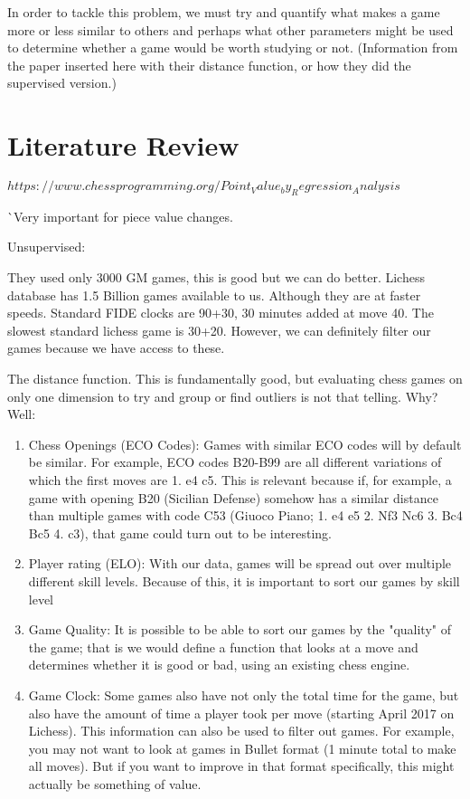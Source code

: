 \documentclass[12pt]{article}
\begin{document}
    In order to tackle this problem, we must try and quantify what makes a game more or less similar to others and perhaps what other parameters might be used to determine whether a game would be worth studying or not. (Information from the paper inserted here with their distance function, or how they did the supervised version.)

    \section{Literature Review}

    $https://www.chessprogramming.org/Point_Value_by_Regression_Analysis$

    ^^ Very important for piece value changes.

    Unsupervised:

        They used only 3000 GM games, this is good but we can do better. Lichess database has 1.5 Billion games available to us. Although they are at faster speeds. Standard FIDE clocks are 90+30, 30 minutes added at move 40. The slowest standard lichess game is 30+20. However, we can definitely filter our games because we have access to these. 

        The distance function. This is fundamentally good, but evaluating chess games on only one dimension to try and group or find outliers is not that telling. Why? Well:

        \begin{enumerate}
            \item Chess Openings (ECO Codes): Games with similar ECO codes will by default be similar. For example, ECO codes B20-B99 are all different variations of which the first moves are 1. e4 c5. This is relevant because if, for example, a game with opening B20 (Sicilian Defense) somehow has a similar distance than multiple games with code C53 (Giuoco Piano; 1. e4 e5 2. Nf3 Nc6 3. Bc4 Bc5 4. c3), that game could turn out to be interesting. 
            \item Player rating (ELO): With our data, games will be spread out over multiple different skill levels. Because of this, it is important to sort our games by skill level 
            \item Game Quality: It is possible to be able to sort our games by the "quality" of the game; that is we would define a function that looks at a move and determines whether it is good or bad, using an existing chess engine. 
            \item Game Clock: Some games also have not only the total time for the game, but also have the amount of time a player took per move (starting April 2017 on Lichess). This information can also be used to filter out games. For example, you may not want to look at games in Bullet format (1 minute total to make all moves). But if you want to improve in that format specifically, this might actually be something of value.
        \end{enumerate}
\end{document}
